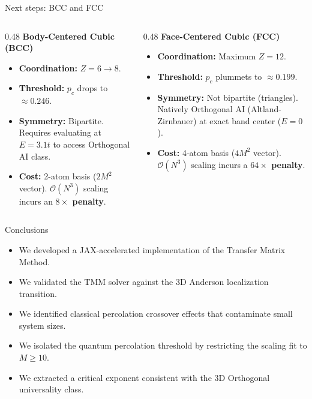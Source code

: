 \documentclass[10pt,aspectratio=169]{beamer}
\begin{document}
\begin{frame}{Next steps: BCC and FCC}
  \begin{columns}[T]
    \begin{column}{0.48\textwidth}
      \textbf{Body-Centered Cubic (BCC)}
      \begin{itemize}
        \item \textbf{Coordination:} $Z=6 \rightarrow 8$.
        \item \textbf{Threshold:} $p_c$ drops to $\approx 0.246$.
        \item \textbf{Symmetry:} Bipartite. Requires evaluating at $E=3.1t$ to access Orthogonal AI class.
        \item \textbf{Cost:} 2-atom basis ($2M^2$ vector). $\mathcal{O}(N^3)$ scaling incurs an \textbf{$8\times$ penalty}.
      \end{itemize}
    \end{column}
    
    \begin{column}{0.48\textwidth}
      \textbf{Face-Centered Cubic (FCC)}
      \begin{itemize}
        \item \textbf{Coordination:} Maximum $Z=12$.
        \item \textbf{Threshold:} $p_c$ plummets to $\approx 0.199$.
        \item \textbf{Symmetry:} Not bipartite (triangles). Natively Orthogonal AI (Altland-Zirnbauer) at exact band center ($E=0$).
        \item \textbf{Cost:} 4-atom basis ($4M^2$ vector). $\mathcal{O}(N^3)$ scaling incurs a \textbf{$64\times$ penalty}.
      \end{itemize}
    \end{column}
  \end{columns}
\end{frame}

\begin{frame}{Conclusions}
  \begin{itemize}
    \item We developed a JAX-accelerated implementation of the Transfer Matrix Method.
    \item We validated the TMM solver against the 3D Anderson localization transition.
    \item We identified classical percolation crossover effects that contaminate small system sizes.
    \item We isolated the quantum percolation threshold by restricting the scaling fit to $M \ge 10$.
    \item We extracted a critical exponent consistent with the 3D Orthogonal universality class.
  \end{itemize}
\end{frame}
\end{document}

